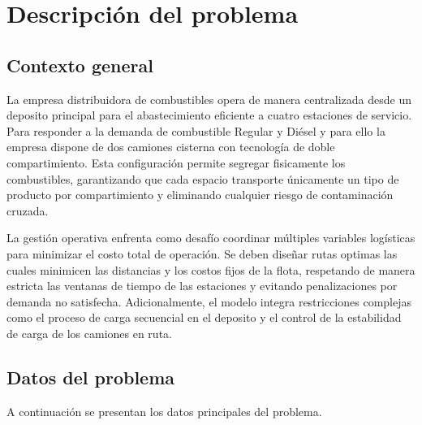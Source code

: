 \section{Descripción del problema}

\subsection{Contexto general}

La empresa distribuidora de combustibles opera de manera centralizada desde un deposito principal para el abastecimiento eficiente a cuatro estaciones de servicio. Para responder a la demanda de combustible Regular y Diésel y para ello la empresa dispone de dos camiones cisterna con tecnología de doble compartimiento. Esta configuración permite segregar fisicamente los combustibles, garantizando que cada espacio transporte únicamente un tipo de producto por compartimiento y eliminando cualquier riesgo de contaminación cruzada.

La gestión operativa enfrenta como desafío coordinar múltiples variables logísticas para minimizar el costo total de operación. Se deben diseñar rutas optimas las cuales minimicen las distancias y los costos fijos de la flota, respetando de manera estricta las ventanas de tiempo de las estaciones y evitando penalizaciones por demanda no satisfecha. Adicionalmente, el modelo integra restricciones complejas como el proceso de carga secuencial en el deposito y el control de la estabilidad de carga de los camiones en ruta.

\subsection{Datos del problema}

A continuación se presentan los datos principales del problema.



